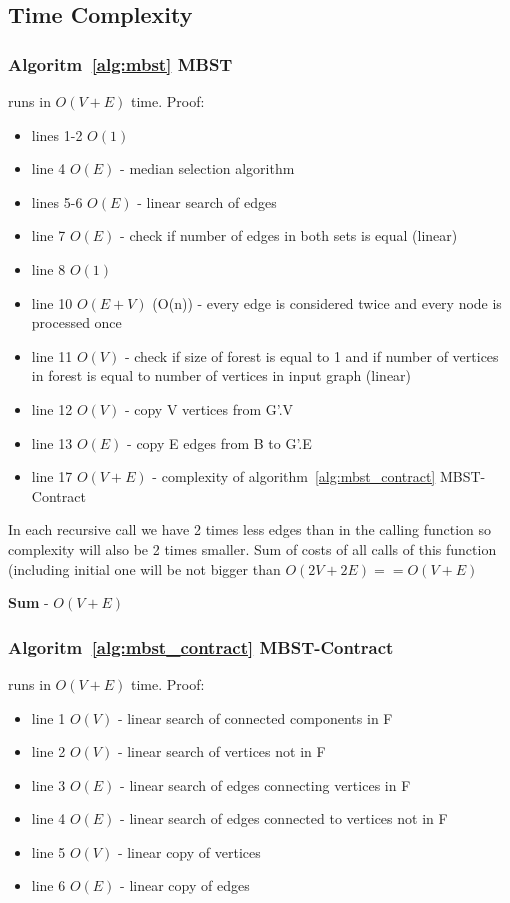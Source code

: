 \documentclass[runningheads, a4paper]{llncs}
\begin{document}
\subsection{Time Complexity}
\subsubsection{Algoritm~\ref{alg:mbst} MBST}
runs in $O(V+E)$ time. Proof:

\begin{itemize}
  \item lines 1-2 $O(1)$ 
  \item line 4 $O(E)$ - median selection algorithm \cite{cormen_9}
  \item lines 5-6 $O(E)$ - linear search of edges
  \item line 7 $O(E)$ - check if number of edges  in both sets is equal (linear)
  \item line 8 $O(1)$
  \item line 10 $O(E+V)$ (O(n)) - every edge is considered twice and every node is processed once
  \item line 11 $O(V)$ - check if size of forest is equal to 1 and if number of vertices in forest is equal to number of vertices in input graph (linear)
  \item line 12 $O(V)$ - copy V vertices from G'.V
  \item line 13 $O(E)$ - copy E edges from B to G'.E
  \item line 17 $O(V+E)$ - complexity of algorithm~\ref{alg:mbst_contract} MBST-Contract
\end{itemize}

In each recursive call we have 2 times less edges than in the calling function so complexity will also be 2 times smaller. Sum of costs of all calls of this function (including initial one will be not bigger than $O(2V + 2E) == O(V+E)$

\textbf{Sum} - $O(V + E)$
\subsubsection{Algoritm~\ref{alg:mbst_contract} MBST-Contract}
runs in $O(V+E)$ time. Proof:

\begin{itemize}
    \item line 1 $O(V)$ - linear search of connected components in F
    \item line 2 $O(V)$ - linear search of vertices not in F
    \item line 3 $O(E)$ - linear search of edges connecting vertices in F
    \item line 4 $O(E)$ - linear search of edges connected to vertices not in F
    \item line 5 $O(V)$ - linear copy of vertices
    \item line 6 $O(E)$ - linear copy of edges
\end{itemize}
\end{document}
